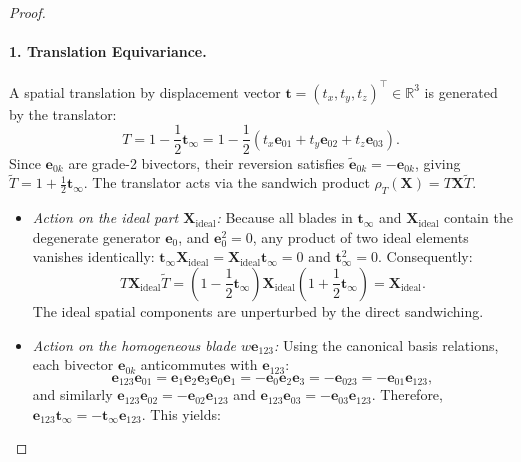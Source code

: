\documentclass[10pt]{article}
\begin{document}
\begin{proof}
\paragraph{1. Translation Equivariance.}
A spatial translation by displacement vector $\mathbf{t} = (t_x, t_y, t_z)^\top \in \mathbb{R}^3$ is generated by the translator:
\begin{equation}
    T = 1 - \frac{1}{2}\mathbf{t}_\infty = 1 - \frac{1}{2}(t_x \mathbf{e}_{01} + t_y \mathbf{e}_{02} + t_z \mathbf{e}_{03}).
\end{equation}
Since $\mathbf{e}_{0k}$ are grade-2 bivectors, their reversion satisfies $\widetilde{\mathbf{e}}_{0k} = -\mathbf{e}_{0k}$, giving $\widetilde{T} = 1 + \frac{1}{2}\mathbf{t}_\infty$.
The translator acts via the sandwich product $\rho_T(\mathbf{X}) = T \mathbf{X} \widetilde{T}$.
\begin{itemize}
    \item \emph{Action on the ideal part $\mathbf{X}_{\text{ideal}}$:} Because all blades in $\mathbf{t}_\infty$ and $\mathbf{X}_{\text{ideal}}$ contain the degenerate generator $\mathbf{e}_0$, and $\mathbf{e}_0^2 = 0$, any product of two ideal elements vanishes identically: $\mathbf{t}_\infty \mathbf{X}_{\text{ideal}} = \mathbf{X}_{\text{ideal}} \mathbf{t}_\infty = 0$ and $\mathbf{t}_\infty^2 = 0$. Consequently:
    \begin{equation}
        T \mathbf{X}_{\text{ideal}} \widetilde{T} = \left(1 - \frac{1}{2}\mathbf{t}_\infty\right) \mathbf{X}_{\text{ideal}} \left(1 + \frac{1}{2}\mathbf{t}_\infty\right) = \mathbf{X}_{\text{ideal}}.
    \end{equation}
    The ideal spatial components are unperturbed by the direct sandwiching.
    \item \emph{Action on the homogeneous blade $w \mathbf{e}_{123}$:}
    Using the canonical basis relations, each bivector $\mathbf{e}_{0k}$ anticommutes with $\mathbf{e}_{123}$:
    \begin{equation}
        \mathbf{e}_{123} \mathbf{e}_{01} = \mathbf{e}_1 \mathbf{e}_2 \mathbf{e}_3 \mathbf{e}_0 \mathbf{e}_1 = -\mathbf{e}_0 \mathbf{e}_2 \mathbf{e}_3 = -\mathbf{e}_{023} = -\mathbf{e}_{01} \mathbf{e}_{123},
    \end{equation}
    and similarly $\mathbf{e}_{123} \mathbf{e}_{02} = -\mathbf{e}_{02} \mathbf{e}_{123}$ and $\mathbf{e}_{123} \mathbf{e}_{03} = -\mathbf{e}_{03} \mathbf{e}_{123}$. Therefore, $\mathbf{e}_{123} \mathbf{t}_\infty = -\mathbf{t}_\infty \mathbf{e}_{123}$.
    This yields:
    \begin{equation}

\end{equation}
\end{itemize}
\end{proof}
\end{document}
